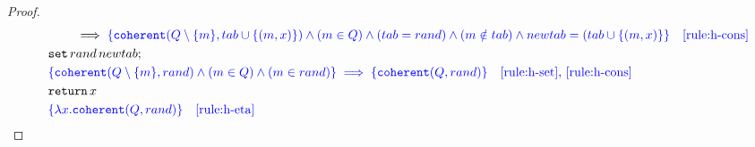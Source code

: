 \begin{proof}
{\begin{align*}
\begin{aligned}
    & \quad\qquad \implies \color{blue} \{ \mathtt{coherent}(Q \setminus \{m\}, tab \cup \{ (m, x) \}) \land (m \in Q) \land (tab=rand) \land (m \notin tab) \land newtab = (tab \cup \{ (m, x) \} \} \quad \text{\ref{rule:h-cons}} \\
    &\quad \mathtt{set}\,rand\,newtab; \\
    &\quad \color{blue} \{ \mathtt{coherent}(Q \setminus \{m\}, rand) \land (m \in Q) \land (m \in rand) \} \implies \color{blue} \{ \mathtt{coherent}(Q, rand) \} \quad \text{\ref{rule:h-set}, \ref{rule:h-cons}} \\
    &\quad \mathtt{return}\, x \\
    &\quad \color{blue} \{ \lambda x.\mathtt{coherent}(Q, rand) \} \quad \text{\ref{rule:h-eta}}
\end{aligned}
\end{align*}
}
\end{proof}

\normalsize

